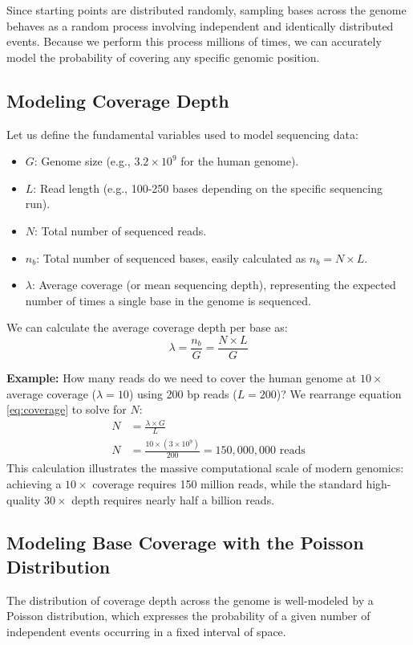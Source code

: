 Since starting points are distributed randomly, sampling bases across the genome behaves as a random process involving independent and identically distributed events. Because we perform this process millions of times, we can accurately model the probability of covering any specific genomic position.

\subsection{Modeling Coverage Depth}
Let us define the fundamental variables used to model sequencing data:
\begin{itemize}
    \item $G$: Genome size (e.g., $3.2 \times 10^9$ for the human genome).
    \item $L$: Read length (e.g., 100-250 bases depending on the specific sequencing run).
    \item $N$: Total number of sequenced reads.
    \item $n_b$: Total number of sequenced bases, easily calculated as $n_b = N \times L$.
    \item $\lambda$: Average coverage (or mean sequencing depth), representing the expected number of times a single base in the genome is sequenced.
\end{itemize}

We can calculate the average coverage depth per base as:
\begin{equation} \label{eq:coverage}
    \lambda = \frac{n_b}{G} = \frac{N \times L}{G}
\end{equation}

\textbf{Example:} How many reads do we need to cover the human genome at $10\times$ average coverage ($\lambda = 10$) using 200 bp reads ($L = 200$)?
We rearrange equation \eqref{eq:coverage} to solve for $N$:
\begin{align*}
    N &= \frac{\lambda \times G}{L} \\
    N &= \frac{10 \times (3 \times 10^9)}{200} = 150,000,000 \text{ reads}
\end{align*}
This calculation illustrates the massive computational scale of modern genomics: achieving a $10\times$ coverage requires 150 million reads, while the standard high-quality $30\times$ depth requires nearly half a billion reads.

\subsection{Modeling Base Coverage with the Poisson Distribution}
The distribution of coverage depth across the genome is well-modeled by a Poisson distribution, which expresses the probability of a given number of independent events occurring in a fixed interval of space.

